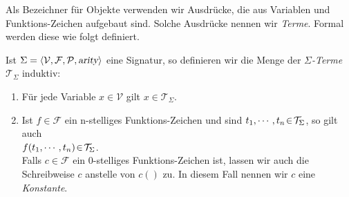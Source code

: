\noindent
Als Bezeichner f\"{u}r Objekte verwenden wir Ausdr\"{u}cke, die aus Variablen und
Funktions-Zeichen aufgebaut sind.  Solche Ausdr\"{u}cke nennen wir {\emph{\color{blue}Terme}}.  
Formal werden diese wie folgt definiert.
\begin{Definition}
  Ist $\Sigma = \langle \mathcal{V}, \mathcal{F}, \mathcal{P}, \textsl{arity} \rangle$ eine Signatur, so definieren wir die Menge der \emph{\color{blue}$\Sigma$-Terme}
  $\mathcal{T}_\Sigma$ induktiv:
  \begin{enumerate}
  \item F\"{u}r jede Variable $x \in \mathcal{V}$ gilt $x \in \mathcal{T}_\Sigma$.
  \item Ist $f \in \mathcal{F}$ ein n-stelliges Funktions-Zeichen und sind 
        $t_1,\cdots,t_n \!\in\! \mathcal{T}_\Sigma$, so gilt auch \\[0.2cm]
        \hspace*{1.3cm} $f(t_1,\cdots,t_n) \!\in\! \mathcal{T}_\Sigma$. \\[0.2cm]
        Falls $c \in \mathcal{F}$ ein 0-stelliges Funktions-Zeichen ist, lassen wir auch die Schreibweise
        $c$ anstelle von $c()$ zu.  In diesem Fall nennen wir $c$ eine {\emph{\color{blue}Konstante}}.
        \eox
  \end{enumerate}
\end{Definition}

